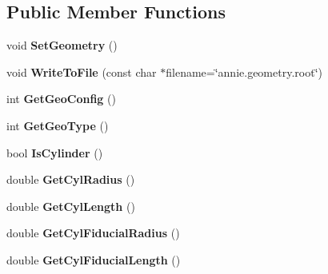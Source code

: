 \subsection*{Public Member Functions}
\begin{DoxyCompactItemize}
\item 
\hypertarget{classANNIEGeometry_a143bd07247da431b54d152fa7cb5c7cf}{
void {\bfseries SetGeometry} ()}
\label{classANNIEGeometry_a143bd07247da431b54d152fa7cb5c7cf}

\item 
\hypertarget{classANNIEGeometry_ab765a9957be6e19208c25fa0e6603ab7}{
void {\bfseries WriteToFile} (const char $\ast$filename=\char`\"{}annie.geometry.root\char`\"{})}
\label{classANNIEGeometry_ab765a9957be6e19208c25fa0e6603ab7}

\item 
\hypertarget{classANNIEGeometry_a4a2b51837cbc2b52159fde213624f07b}{
int {\bfseries GetGeoConfig} ()}
\label{classANNIEGeometry_a4a2b51837cbc2b52159fde213624f07b}

\item 
\hypertarget{classANNIEGeometry_a181399c8d8d8e1e7deaf5e26fc19f6a2}{
int {\bfseries GetGeoType} ()}
\label{classANNIEGeometry_a181399c8d8d8e1e7deaf5e26fc19f6a2}

\item 
\hypertarget{classANNIEGeometry_af52285d65bb359e199d5516215e9d4b2}{
bool {\bfseries IsCylinder} ()}
\label{classANNIEGeometry_af52285d65bb359e199d5516215e9d4b2}

\item 
\hypertarget{classANNIEGeometry_af4067a89f27815d2be201734cf88ef66}{
double {\bfseries GetCylRadius} ()}
\label{classANNIEGeometry_af4067a89f27815d2be201734cf88ef66}

\item 
\hypertarget{classANNIEGeometry_aeb5d59529df45997aa9e88d439fefbba}{
double {\bfseries GetCylLength} ()}
\label{classANNIEGeometry_aeb5d59529df45997aa9e88d439fefbba}

\item 
\hypertarget{classANNIEGeometry_a3dce208ec7515a6db41b29a222ef7a4c}{
double {\bfseries GetCylFiducialRadius} ()}
\label{classANNIEGeometry_a3dce208ec7515a6db41b29a222ef7a4c}

\item 
\hypertarget{classANNIEGeometry_adda169892f173736e7873a0994fa37b6}{
double {\bfseries GetCylFiducialLength} ()}
\label{classANNIEGeometry_adda169892f173736e7873a0994fa37b6}


\end{DoxyCompactItemize}
